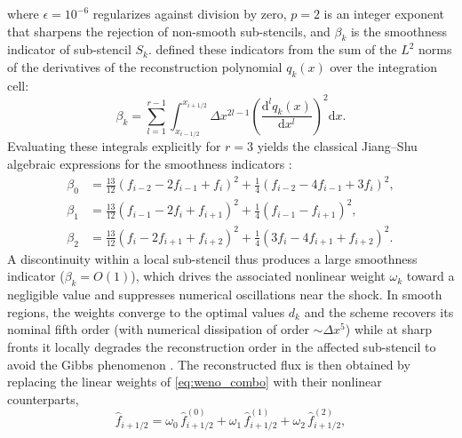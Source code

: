 \documentclass[lineno]{JFM-FLM_Au}
\begin{document}
where $\epsilon = 10^{-6}$ regularizes against division by zero, $p=2$ is an integer exponent that sharpens the rejection of non-smooth sub-stencils, and $\beta_k$ is the smoothness indicator of sub-stencil $S_k$. \citet{JiangShu1996} defined these indicators from the sum of the $L^2$ norms of the derivatives of the reconstruction polynomial $q_k(x)$ over the integration cell:
\begin{equation}
    \beta_k = \sum_{l=1}^{r-1} \int_{x_{i-1/2}}^{x_{i+1/2}} \Delta x^{2l-1} \left(\frac{\mathrm{d}^l q_k(x)}{\mathrm{d}x^l}\right)^2 \mathrm{d}x.
    \label{eq:beta_general}
\end{equation}
Evaluating these integrals explicitly for $r=3$ yields the classical Jiang--Shu algebraic expressions for the smoothness indicators \citep{JiangShu1996}:
\begin{align}
    \beta_0 &= \tfrac{13}{12}(f_{i-2}-2f_{i-1}+f_i)^2 + \tfrac{1}{4}(f_{i-2}-4f_{i-1}+3f_i)^2, \label{eq:beta0}\\
    \beta_1 &= \tfrac{13}{12}(f_{i-1}-2f_i+f_{i+1})^2 + \tfrac{1}{4}(f_{i-1}-f_{i+1})^2, \label{eq:beta1}\\
    \beta_2 &= \tfrac{13}{12}(f_i-2f_{i+1}+f_{i+2})^2 + \tfrac{1}{4}(3f_i-4f_{i+1}+f_{i+2})^2. \label{eq:beta2}
\end{align}
A discontinuity within a local sub-stencil thus produces a large smoothness indicator ($\beta_k = O(1)$), which drives the associated nonlinear weight $\omega_k$ toward a negligible value and suppresses numerical oscillations near the shock. In smooth regions, the weights converge to the optimal values $d_k$ and the scheme recovers its nominal fifth order (with numerical dissipation of order $\sim\Delta x^5$) while at sharp fronts it locally degrades the reconstruction order in the affected sub-stencil to avoid the Gibbs phenomenon \citep{JiangShu1996}. The reconstructed flux is then obtained by replacing the linear weights of \eqref{eq:weno_combo} with their nonlinear counterparts,
\begin{equation}
    \hat f_{i+1/2} = \omega_0\, \hat f_{i+1/2}^{(0)} + \omega_1\, \hat f_{i+1/2}^{(1)} + \omega_2\, \hat f_{i+1/2}^{(2)},
    \label{eq:weno_nonlinear_combo}
\end{equation}
\end{document}
